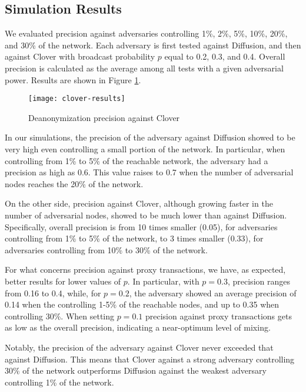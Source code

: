 \documentclass{article}
\begin{document}
	\subsection{Simulation Results}
	We evaluated precision against adversaries controlling 1\%, 2\%, 5\%, 10\%, 20\%, and 30\% of the network. 
	Each adversary is first tested against Diffusion, and then against Clover with broadcast probability $p$ equal to 0.2, 0.3, and 0.4.
	Overall precision is calculated as the average among all tests with a given adversarial power.
	Results are shown in Figure \ref{fig:results}.
	\begin{figure}[tbp]
		\centerline{\texttt{[image: clover-results]}}
		\caption{Deanonymization precision against Clover}
		\label{fig:results}
	\end{figure}
	
	In our simulations, the precision of the adversary against Diffusion showed to be very high even controlling a small portion of the network.
	In particular, when controlling from 1\% to 5\% of the reachable network, the adversary had a precision as high as 0.6. 
	This value raises to 0.7 when the number of adversarial nodes reaches the 20\% of the network.
	
	On the other side, precision against Clover, although growing faster in the number of adversarial nodes, showed to be much lower than against Diffusion.
	Specifically, overall precision is from 10 times smaller (0.05), for adversaries controlling from 1\% to 5\% of the network, to 3 times smaller (0.33), for adversaries controlling from 10\% to 30\% of the network.
	
	For what concerns precision against proxy transactions,
	we have, as expected, better results for lower values of $p$.
	In particular, with $p=0.3$, precision ranges from 0.16 to 0.4, while, for $p=0.2$, the adversary showed an average precision of 0.14 when the controlling 1-5\% of the reachable nodes, and up to 0.35 when controlling 30\%.
	When setting $p=0.1$ precision against proxy transactions gets as low as the overall precision, indicating a near-optimum level of mixing.
	
	Notably, the precision of the adversary against Clover never exceeded that against Diffusion.
	This means that Clover against a strong adversary controlling 30\% of the network outperforms Diffusion against the weakest adversary controlling 1\% of the network.
	
\end{document}
